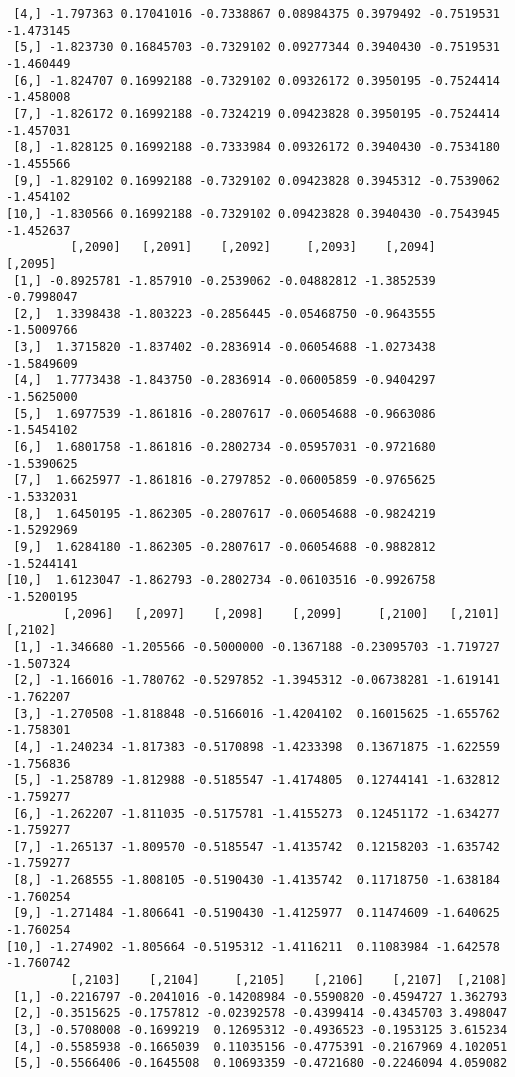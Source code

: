 \documentclass[
  letterpaper,
  DIV=11,
  numbers=noendperiod]{scrreprt}
\begin{document}
\begin{verbatim}
 [4,] -1.797363 0.17041016 -0.7338867 0.08984375 0.3979492 -0.7519531 -1.473145
 [5,] -1.823730 0.16845703 -0.7329102 0.09277344 0.3940430 -0.7519531 -1.460449
 [6,] -1.824707 0.16992188 -0.7329102 0.09326172 0.3950195 -0.7524414 -1.458008
 [7,] -1.826172 0.16992188 -0.7324219 0.09423828 0.3950195 -0.7524414 -1.457031
 [8,] -1.828125 0.16992188 -0.7333984 0.09326172 0.3940430 -0.7534180 -1.455566
 [9,] -1.829102 0.16992188 -0.7329102 0.09423828 0.3945312 -0.7539062 -1.454102
[10,] -1.830566 0.16992188 -0.7329102 0.09423828 0.3940430 -0.7543945 -1.452637
         [,2090]   [,2091]    [,2092]     [,2093]    [,2094]    [,2095]
 [1,] -0.8925781 -1.857910 -0.2539062 -0.04882812 -1.3852539 -0.7998047
 [2,]  1.3398438 -1.803223 -0.2856445 -0.05468750 -0.9643555 -1.5009766
 [3,]  1.3715820 -1.837402 -0.2836914 -0.06054688 -1.0273438 -1.5849609
 [4,]  1.7773438 -1.843750 -0.2836914 -0.06005859 -0.9404297 -1.5625000
 [5,]  1.6977539 -1.861816 -0.2807617 -0.06054688 -0.9663086 -1.5454102
 [6,]  1.6801758 -1.861816 -0.2802734 -0.05957031 -0.9721680 -1.5390625
 [7,]  1.6625977 -1.861816 -0.2797852 -0.06005859 -0.9765625 -1.5332031
 [8,]  1.6450195 -1.862305 -0.2807617 -0.06054688 -0.9824219 -1.5292969
 [9,]  1.6284180 -1.862305 -0.2807617 -0.06054688 -0.9882812 -1.5244141
[10,]  1.6123047 -1.862793 -0.2802734 -0.06103516 -0.9926758 -1.5200195
        [,2096]   [,2097]    [,2098]    [,2099]     [,2100]   [,2101]   [,2102]
 [1,] -1.346680 -1.205566 -0.5000000 -0.1367188 -0.23095703 -1.719727 -1.507324
 [2,] -1.166016 -1.780762 -0.5297852 -1.3945312 -0.06738281 -1.619141 -1.762207
 [3,] -1.270508 -1.818848 -0.5166016 -1.4204102  0.16015625 -1.655762 -1.758301
 [4,] -1.240234 -1.817383 -0.5170898 -1.4233398  0.13671875 -1.622559 -1.756836
 [5,] -1.258789 -1.812988 -0.5185547 -1.4174805  0.12744141 -1.632812 -1.759277
 [6,] -1.262207 -1.811035 -0.5175781 -1.4155273  0.12451172 -1.634277 -1.759277
 [7,] -1.265137 -1.809570 -0.5185547 -1.4135742  0.12158203 -1.635742 -1.759277
 [8,] -1.268555 -1.808105 -0.5190430 -1.4135742  0.11718750 -1.638184 -1.760254
 [9,] -1.271484 -1.806641 -0.5190430 -1.4125977  0.11474609 -1.640625 -1.760254
[10,] -1.274902 -1.805664 -0.5195312 -1.4116211  0.11083984 -1.642578 -1.760742
         [,2103]    [,2104]     [,2105]    [,2106]    [,2107]  [,2108]
 [1,] -0.2216797 -0.2041016 -0.14208984 -0.5590820 -0.4594727 1.362793
 [2,] -0.3515625 -0.1757812 -0.02392578 -0.4399414 -0.4345703 3.498047
 [3,] -0.5708008 -0.1699219  0.12695312 -0.4936523 -0.1953125 3.615234
 [4,] -0.5585938 -0.1665039  0.11035156 -0.4775391 -0.2167969 4.102051
 [5,] -0.5566406 -0.1645508  0.10693359 -0.4721680 -0.2246094 4.059082

\end{verbatim}
\end{document}
